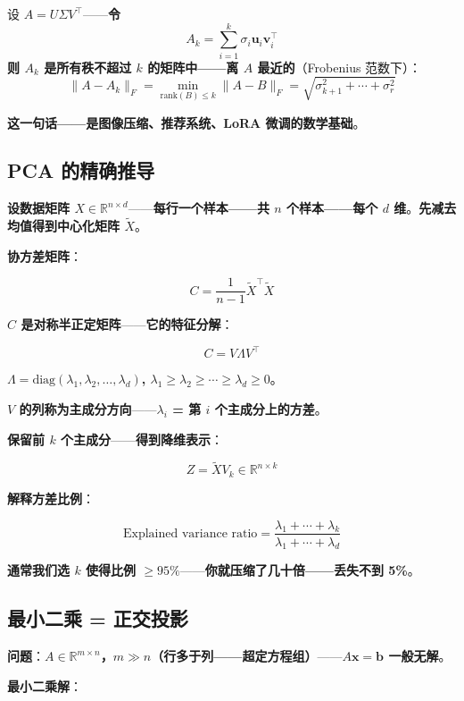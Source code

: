 \begin{theorem}
设 $A = U \Sigma V^{\!\top}$——\textbf{令}
\[
A_k = \sum_{i=1}^{k} \sigma_i \bm{u}_i \bm{v}_i^{\!\top}
\]
\textbf{则 $A_k$ 是所有秩不超过 $k$ 的矩阵中——离 $A$ 最近的}（Frobenius 范数下）：
\[
\|A - A_k\|_F = \min_{\mathrm{rank}(B) \le k} \|A - B\|_F = \sqrt{\sigma_{k+1}^2 + \cdots + \sigma_r^2}
\]
\end{theorem}

\textbf{这一句话——是图像压缩、推荐系统、LoRA 微调的数学基础}。

\subsection{PCA 的精确推导}

\textbf{设数据矩阵 $X \in \mathbb{R}^{n \times d}$}——\textbf{每行一个样本——共 $n$ 个样本——每个 $d$ 维}。\textbf{先减去均值得到中心化矩阵 $\tilde{X}$}。

\textbf{协方差矩阵}：

\[
C = \frac{1}{n-1} \tilde{X}^{\!\top} \tilde{X}
\]

\textbf{$C$ 是对称半正定矩阵}——\textbf{它的特征分解}：

\[
C = V \Lambda V^{\!\top}
\]

\textbf{$\Lambda = \mathrm{diag}(\lambda_1, \lambda_2, \dots, \lambda_d)$, $\lambda_1 \ge \lambda_2 \ge \cdots \ge \lambda_d \ge 0$}。

\textbf{$V$ 的列称为主成分方向}——\textbf{$\lambda_i$ = 第 $i$ 个主成分上的方差}。

\textbf{保留前 $k$ 个主成分}——\textbf{得到降维表示}：

\[
Z = \tilde{X} V_k \in \mathbb{R}^{n \times k}
\]

\textbf{解释方差比例}：

\[
\text{Explained variance ratio} = \frac{\lambda_1 + \cdots + \lambda_k}{\lambda_1 + \cdots + \lambda_d}
\]

\textbf{通常我们选 $k$ 使得比例 $\ge 95\%$}——\textbf{你就压缩了几十倍——丢失不到 5\%}。

\subsection{最小二乘 = 正交投影}

\textbf{问题}：\textbf{$A \in \mathbb{R}^{m \times n}$，$m \gg n$（行多于列——超定方程组）}——\textbf{$A\bm{x} = \bm{b}$ 一般无解}。

\textbf{最小二乘解}：

